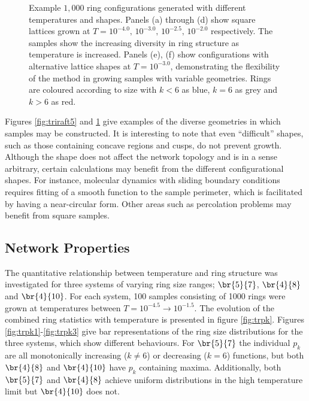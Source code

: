 \begin{figure}[h!]
\begin{subfigure}[b]{0.35\textwidth}
         \caption{}
         \label{fig:triraft6}
     \end{subfigure}
     
     \caption{Example $1,000$ ring configurations generated with different temperatures and shapes. Panels (a) through (d) show square lattices grown at $T=10^{-4.0},\,10^{-3.0},\,10^{-2.5},\, 10^{-2.0}$ respectively. The samples show the increasing diversity in ring structure as temperature is increased. Panels (e), (f) show configurations with alternative lattice shapes at $T=10^{-3.0}$, demonstrating the flexibility of the method in growing samples with variable geometries. Rings are coloured according to size with $k<6$ as blue, $k=6$ as grey and $k>6$ as red.}
     \label{fig:triraft}
\end{figure}

Figures \ref{fig:triraft5} and \ref{fig:triraft6} give examples of the diverse geometries in which samples may be constructed. 
It is interesting to note that even ``difficult'' shapes, such as those containing concave regions and cusps, do not prevent growth.  
Although the shape does not affect the network topology and is in a sense arbitrary, certain calculations may benefit from the different configurational shapes. 
For instance, molecular dynamics with sliding boundary conditions requires fitting of a smooth function to the sample perimeter, which is facilitated by having a near\--circular form.
Other areas such as percolation problems may benefit from square samples.

\subsection{Network Properties}
\label{s:triraftnetprop}

The quantitative relationship between temperature and ring structure was investigated for three systems of varying ring size ranges;  $\br{5}{7}$, $\br{4}{8}$ and $\br{4}{10}$. 
For each system, 100 samples consisting of 1000 rings were grown at temperatures between $T=10^{-4.5}\rightarrow 10^{-1.5}$. 
The evolution of the combined ring statistics with temperature is presented in figure \ref{fig:trpk}. 
Figures \ref{fig:trpk1}\--\ref{fig:trpk3} give bar representations of the ring size distributions for the three systems, which show different behaviours. 
For $\br{5}{7}$ the individual $p_k$ are all monotonically increasing ($k\neq 6$) or decreasing ($k=6$) functions, but both $\br{4}{8}$ and $\br{4}{10}$ have $p_k$ containing maxima. 
Additionally, both $\br{5}{7}$ and $\br{4}{8}$ achieve uniform distributions in the high temperature limit but $\br{4}{10}$ does not. 

